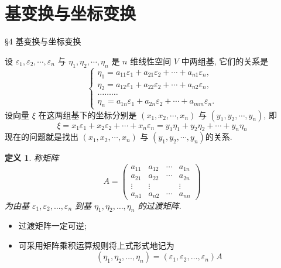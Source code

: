 \documentclass[13pt]{beamer}
\newtheorem*{defi}{定义}
\begin{document}
\section{基变换与坐标变换}
\begin{frame}{\S 4 基变换与坐标变换}
%
%

设 ${\varepsilon}_{1}, {\varepsilon}_{2}, \cdots, {\varepsilon}_{n}$ 
与 ${\eta}_{1}, {\eta}_{2}, \cdots, {\eta}_{n}$ 是 $n$ 维线性空间 $V$ 中两组基,
它们的关系是
\begin{equation}\label{eq-4-1}
\left\{\begin{array}{l}
{\eta}_{1}=a_{11} {\varepsilon}_{1}+a_{21} {\varepsilon}_{2}+\cdots+a_{n 1} {\varepsilon}_{n}, \\
{\eta}_{2}=a_{12} {\varepsilon}_{1}+a_{22} {\varepsilon}_{2}+\cdots+a_{n 2} {\varepsilon}_{n}, \\
\ldots \ldots \ldots \\
{\eta}_{n}=a_{1 n} {\varepsilon}_{1}+a_{2 n} {\varepsilon}_{2}+\cdots+a_{m m} {\varepsilon}_{n}.
\end{array}\right.
\end{equation}
设向量 $\xi$ 在这两组基下的坐标分别是 $\left(x_{1}, x_{2}, \cdots, x_{n}\right)$ 与 $\left( y_1, y_2, \cdots, y_n\right)$, 即
\[
\xi=x_{1} \varepsilon_{1}+x_{2} \varepsilon_{2}+\cdots+x_{n} \varepsilon_{n}=y_1 \eta_{1}+y_2 \eta_{2}+\cdots+y_n \eta_{n}
\]
现在的问题就是找出 $\left(x_{1}, x_{2}, \cdots, x_{n}\right)$ 与 $\left( y_1, y_2, \cdots, y_n\right)$的关系.
\end{frame}


\begin{frame}
\begin{defi}
称矩阵
$$A=\left(
\begin{array}{cccc} 
a_{11} & a_{12} & \cdots & a_{1 n} \\ 
a_{21} & a_{22} & \cdots & a_{2 n} \\
\vdots & \vdots & & \vdots \\  
a_{n 1} & a_{n 2} & \cdots & a_{n n}
\end{array}\right)$$
为由基 $\varepsilon_{1}, \varepsilon_{2}, \dots, \varepsilon_{n}$
到基 $\eta_{1}, \eta_{2}, \ldots, \eta_{n}$ 的\alert{过渡矩阵}.
\end{defi}

\begin{itemize}
\item 过渡矩阵一定可逆;
\item 可采用矩阵乘积运算规则将上式\alert{形式}地记为
\[
\left(\eta_{1}, \eta_{2}, \ldots, \eta_{n}\right)=\left(\varepsilon_{1}, \varepsilon_{2}, \ldots, \varepsilon_{n}\right) A
\]
\end{itemize}\end{frame}
\end{document}

